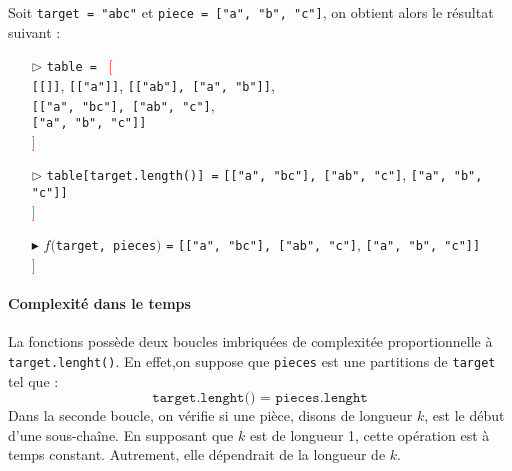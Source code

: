 \documentclass[10pt]{report}
\begin{document}
  \begin{EExample}{}{}
    Soit \texttt{target = "abc"} et \texttt{piece = ["a", "b", "c"]}, on obtient 
    alors le résultat suivant : 
    \begin{itemize}
      \item [$\rhd$] \texttt{table = } \textcolor{red}{[}
        \\ \texttt{\textcolor{myb}{[}[]\textcolor{myb}{]}}, 
        \texttt{\textcolor{myb}{[}["a"]\textcolor{myb}{]}}, 
        \texttt{\textcolor{myb}{[}["ab"], ["a", "b"]\textcolor{myb}{]}}, \\
        \texttt{\textcolor{myb}{[}["a", "bc"], ["ab", "c"]}, \\ 
        \texttt{["a", "b", "c"]\textcolor{myb}{]}} \\
        \textcolor{red}{]}
      \item [$\rhd$] \texttt{table[target.length()] =}  
        \texttt{\textcolor{myb}{[}["a", "bc"], ["ab", "c"]},  
        \texttt{["a", "b", "c"]\textcolor{myb}{]}} \\
        \textcolor{red}{]}
      \item[$\blacktriangleright$] $f($\texttt{target, pieces}$)$ \texttt{=} 
        \texttt{\textcolor{myb}{[}["a", "bc"], ["ab", "c"]},  
        \texttt{["a", "b", "c"]\textcolor{myb}{]}} \\
        \textcolor{red}{]}


 
    \end{itemize}
     
  \end{EExample}


  \paragraph{Complexité dans le temps}
  La fonctions possède deux boucles imbriquées de complexitée proportionnelle à
  \texttt{target.lenght()}. En effet,on suppose que \texttt{pieces} est une partitions de \texttt{target}   
  tel que :
  \[ \texttt{target.lenght() = pieces.lenght}  \]
  Dans la seconde boucle, on vérifie si une pièce, disons de longueur $k$, 
  est le début d'une sous-chaîne. En supposant que $k$ est de longueur 1, cette opération 
  est à temps constant. Autrement, elle dépendrait de la longueur de $k$.
\end{document}

